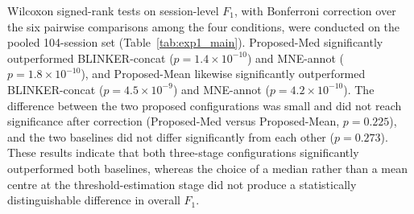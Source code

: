 Wilcoxon signed-rank tests on session-level $F_1$, with Bonferroni correction over the six pairwise comparisons among the four conditions, were conducted on the pooled 104-session set (Table~\ref{tab:exp1_main}). Proposed-Med significantly outperformed BLINKER-concat ($p=1.4\times10^{-10}$) and MNE-annot ($p=1.8\times10^{-10}$), and Proposed-Mean likewise significantly outperformed BLINKER-concat ($p=4.5\times10^{-9}$) and MNE-annot ($p=4.2\times10^{-10}$). The difference between the two proposed configurations was small and did not reach significance after correction (Proposed-Med versus Proposed-Mean, $p=0.225$), and the two baselines did not differ significantly from each other ($p=0.273$). These results indicate that both three-stage configurations significantly outperformed both baselines, whereas the choice of a median rather than a mean centre at the threshold-estimation stage did not produce a statistically distinguishable difference in overall $F_1$.
